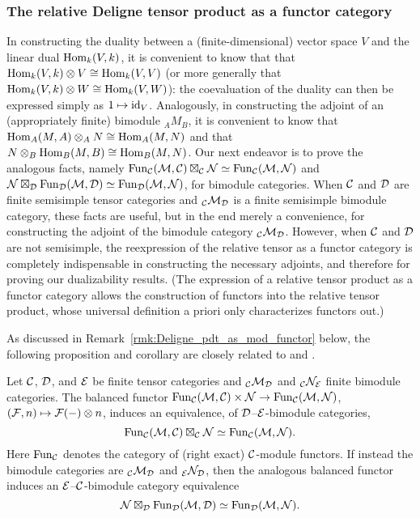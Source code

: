 \documentclass{amsart}
\begin{document}
\subsubsection{The relative Deligne tensor product as a functor category}

In constructing the duality between a (finite-dimensional) vector space $V$ and the linear dual $\operatorname{Hom}_k(V,k)$, it is convenient to know that that $\operatorname{Hom}_k(V,k) \otimes V \cong \operatorname{Hom}_k(V,V)$ (or more generally that $\operatorname{Hom}_k(V,k) \otimes W \cong \operatorname{Hom}_k(V,W)$): the coevaluation of the duality can then be expressed simply as $1 \mapsto \mathrm{id}_V$.  Analogously, in constructing the adjoint of an (appropriately finite) bimodule ${}_A M_B$, it is convenient to know that $\operatorname{Hom}_A(M,A) \otimes_A N \cong \operatorname{Hom}_A(M,N)$ and that $N \otimes_B \operatorname{Hom}_B(M,B) \cong \operatorname{Hom}_B(M,N)$.  Our next endeavor is to prove the analogous facts, namely $\operatorname{Fun}_\mathcal C(\mathcal M,\mathcal C) \boxtimes_\mathcal C \mathcal N \simeq \operatorname{Fun}_\mathcal C(\mathcal M,\mathcal N)$ and $\mathcal N \boxtimes_\mathcal D \operatorname{Fun}_\mathcal D(\mathcal M,\mathcal D) \simeq \operatorname{Fun}_\mathcal D(\mathcal M,\mathcal N)$, for bimodule categories.  When $\mathcal C$ and $\mathcal D$ are finite semisimple tensor categories and ${}_\mathcal C \mathcal M_\mathcal D$ is a finite semisimple bimodule category, these facts are useful, but in the end merely a convenience, for constructing the adjoint of the bimodule category ${}_\mathcal C \mathcal M_\mathcal D$.  However, when $\mathcal C$ and $\mathcal D$ are not semisimple, the reexpression of the relative tensor as a functor category is completely indispensable in constructing the necessary adjoints, and therefore for proving our dualizability results.  (The expression of a relative tensor product as a functor category allows the construction of functors into the relative tensor product, whose universal definition a priori only characterizes functors out.)

As discussed in Remark~\ref{rmk:Deligne_pdt_as_mod_functor} below, the following proposition and corollary are closely related to  \cite[Prop. 3.5 and Rmk. 3.6]{0909.3140} and \cite[Thm. 3.20]{0911.4979}.
\begin{proposition} \label{prop:FunctorsAsATensorPdt}
Let $\mathcal C$, $\mathcal D$, and $\mathcal E$ be finite tensor categories and ${}_\mathcal C \mathcal M_\mathcal D$ and ${}_\mathcal C \mathcal N_\mathcal E$ finite bimodule categories.  The balanced functor $\operatorname{Fun}_\mathcal C(\mathcal M,\mathcal C) \times \mathcal N \rightarrow \operatorname{Fun}_\mathcal C(\mathcal M,\mathcal N)$, $(\mathcal F,n) \mapsto \mathcal F(-) \otimes n$, induces an equivalence, of $\mathcal D$--$\mathcal E$-bimodule categories,
\[
		\operatorname{Fun}_\mathcal C(\mathcal M, \mathcal C) \boxtimes_\mathcal C \mathcal N \simeq \operatorname{Fun}_\mathcal C(\mathcal M,\mathcal N).
\]
Here $\operatorname{Fun}_\mathcal C$ denotes the category of (right exact) $\mathcal C$-module functors.  If instead the bimodule categories are ${}_\mathcal C \mathcal M_\mathcal D$ and ${}_\mathcal E \mathcal N_\mathcal D$, then the analogous balanced functor induces an $\mathcal E$--$\mathcal C$-bimodule category equivalence
\[
\mathcal N \boxtimes_\mathcal D \operatorname{Fun}_{\mathcal D}(\mathcal M,\mathcal D) \simeq \operatorname{Fun}_{\mathcal D}(\mathcal M,\mathcal N).
\]
\end{proposition}
\end{document}
